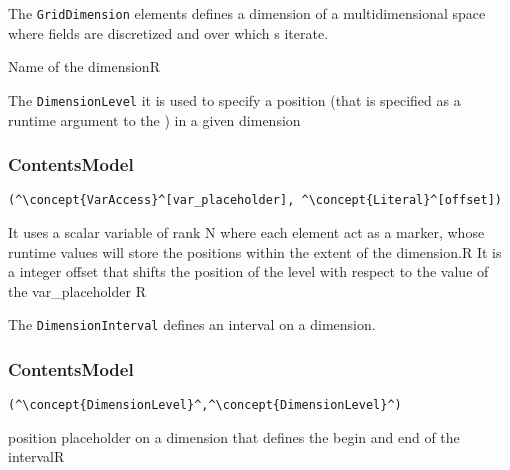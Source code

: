 
The {\tt GridDimension} elements defines a dimension of a multidimensional space where fields are discretized and over which s iterate. 

\HIRContentsModel{ () }
\begin{HIRAttributes}
	{Name of the dimension}{R}
\end{HIRAttributes}


The {\tt DimensionLevel} it is used to specify a position (that is specified as a runtime argument to the ) in a given dimension

\subsubsection*{ContentsModel}{}

\begin{lstlisting}[style=default]
(^\concept{VarAccess}^[var_placeholder], ^\concept{Literal}^[offset])
\end{lstlisting}

\begin{HIRChildElements}
	{It uses a scalar variable of rank N where each element act as a marker, whose runtime values will store the positions within the extent of the dimension.}{R}
	{It is a integer offset that shifts the position of the level with respect to the value of the var\_placeholder }{R}	
\end{HIRChildElements}


The {\tt DimensionInterval} defines an interval on a dimension. 

\subsubsection*{ContentsModel}{}

\begin{lstlisting}[style=default]
(^\concept{DimensionLevel}^,^\concept{DimensionLevel}^)
\end{lstlisting}

\begin{HIRChildElements}
	{position placeholder on a dimension that defines the begin and end of the interval}{R}
\end{HIRChildElements}

